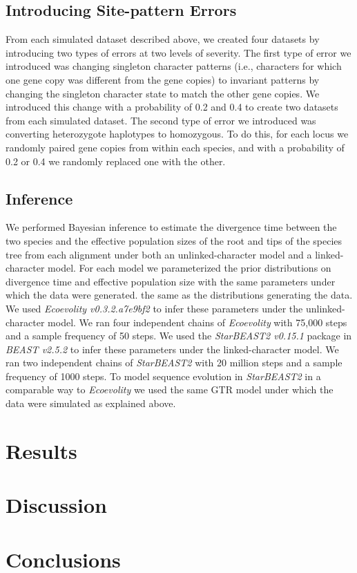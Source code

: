 \subsection{Introducing Site-pattern Errors}
From each simulated dataset described above, we created four datasets by 
introducing two types of errors at two levels of severity. The first type of 
error we introduced was changing singleton character patterns (i.e., characters 
for which one gene copy was different from the gene copies) to invariant 
patterns by changing the singleton character state to match the other gene 
copies. We introduced this change with a probability of 0.2 and 0.4 to create 
two datasets from each simulated dataset. The second type of error we introduced 
was converting heterozygote haplotypes to homozygous. To do this, for each locus 
we randomly paired gene copies from within each species, and with a probability 
of 0.2 or 0.4 we randomly replaced one with the other. 

\subsection{Inference}
We performed Bayesian inference to estimate the divergence time between the two species and the effective 
population sizes of the root and tips of the species tree from each alignment 
under both an unlinked-character model and a linked-character model. For each 
model we parameterized the prior distributions on divergence time and effective
population size with the same parameters under which the data were generated. 
the same as the distributions generating the data.
We used \textit{Ecoevolity v0.3.2.a7e9bf2} to infer these parameters under the 
unlinked-character model. We ran four independent chains of \textit{Ecoevolity} 
with 75,000 steps and a sample frequency of 50 steps.
We used the \textit{StarBEAST2 v0.15.1} package in \textit{BEAST v2.5.2} to 
infer these parameters under the linked-character model. 
We ran two independent chains of \textit{StarBEAST2} with 20 million steps and a 
sample frequency of 1000 steps. 
To model sequence evolution in \textit{StarBEAST2} in a comparable way to \textit{Ecoevolity} we used 
the same GTR model under which the data were simulated as explained above.

\section{Results}


\section{Discussion}


\section{Conclusions}
